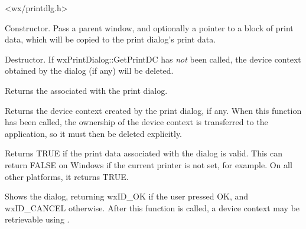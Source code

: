 <wx/printdlg.h>






Constructor. Pass a parent window, and optionally a pointer to a block of print
data, which will be copied to the print dialog's print data.





Destructor. If wxPrintDialog::GetPrintDC has {\it not} been called,
the device context obtained by the dialog (if any) will be deleted.

\label{wxprintdialoggetprintdialogdata}


Returns the  associated with the print dialog.

\label{wxprintdialoggetprintdc}


Returns the device context created by the print dialog, if any.
When this function has been called, the ownership of the device context
is transferred to the application, so it must then be deleted
explicitly.

\label{wxprintdialogok}


Returns TRUE if the print data associated with the dialog is valid.
This can return FALSE on Windows if the current printer is not set, for example.
On all other platforms, it returns TRUE.

\label{wxprintdialogshowmodal}


Shows the dialog, returning wxID\_OK if the user pressed OK, and wxID\_CANCEL
otherwise. After this function is called, a device context may
be retrievable using .

